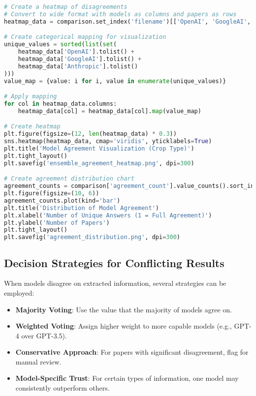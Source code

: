 \begin{commandbox}
\begin{lstlisting}[language=Python]
# Create a heatmap of disagreements
# Convert to wide format with models as columns and papers as rows
heatmap_data = comparison.set_index('filename')[['OpenAI', 'GoogleAI', 'Anthropic']]

# Create categorical mapping for visualization
unique_values = sorted(list(set(
    heatmap_data['OpenAI'].tolist() +
    heatmap_data['GoogleAI'].tolist() +
    heatmap_data['Anthropic'].tolist()
)))
value_map = {value: i for i, value in enumerate(unique_values)}

# Apply mapping
for col in heatmap_data.columns:
    heatmap_data[col] = heatmap_data[col].map(value_map)

# Create heatmap
plt.figure(figsize=(12, len(heatmap_data) * 0.3))
sns.heatmap(heatmap_data, cmap='viridis', yticklabels=True)
plt.title('Model Agreement Visualization (Crop Type)')
plt.tight_layout()
plt.savefig('ensemble_agreement_heatmap.png', dpi=300)

# Create agreement distribution chart
agreement_counts = comparison['agreement_count'].value_counts().sort_index()
plt.figure(figsize=(10, 6))
agreement_counts.plot(kind='bar')
plt.title('Distribution of Model Agreement')
plt.xlabel('Number of Unique Answers (1 = Full Agreement)')
plt.ylabel('Number of Papers')
plt.tight_layout()
plt.savefig('agreement_distribution.png', dpi=300)
\end{lstlisting}
\end{commandbox}


\subsection{Decision Strategies for Conflicting Results}

When models disagree on extracted information, several strategies can be employed:

\begin{itemize}
    \item \textbf{Majority Voting}: Use the value that the majority of models agree on.
    \item \textbf{Weighted Voting}: Assign higher weight to more capable models (e.g., GPT-4 over GPT-3.5).
    \item \textbf{Conservative Approach}: For papers with significant disagreement, flag for manual review.
    \item \textbf{Model-Specific Trust}: For certain types of information, one model may consistently outperform others.
\end{itemize}

